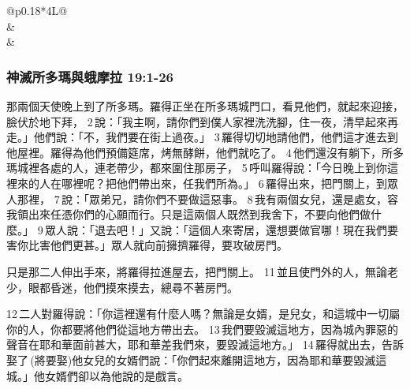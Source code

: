 \begin{table}[!hbp]
\begin{threeparttable}
\begin{tabular}{@{}p{}*{4}{L{\tabcolsep\relax}}@{}}
\\\hline
{}  
& 
\\\hline
{}  
& 
\\\hline

\end{tabular}
\caption{亞伯拉罕為羅得代求}
\label{table:YaBoLanPrayLuoDe}
\end{threeparttable}
\end{table}


\subsubsection{神滅所多瑪與蛾摩拉 19:1-26}
那兩個天使晚上到了所多瑪。羅得正坐在所多瑪城門口，看見他們，就起來迎接，臉伏於地下拜， 2 說：「我主啊，請你們到僕人家裡洗洗腳，住一夜，清早起來再走。」他們說：「不，我們要在街上過夜。」 3 羅得切切地請他們，他們這才進去到他屋裡。羅得為他們預備筵席，烤無酵餅，他們就吃了。 4 他們還沒有躺下，所多瑪城裡各處的人，連老帶少，都來圍住那房子， 5 呼叫羅得說：「今日晚上到你這裡來的人在哪裡呢？把他們帶出來，任我們所為。」 6 羅得出來，把門關上，到眾人那裡， 7 說：「眾弟兄，請你們不要做這惡事。 8 我有兩個女兒，還是處女，容我領出來任憑你們的心願而行。只是這兩個人既然到我舍下，不要向他們做什麼。」 9 眾人說：「退去吧！」又說：「這個人來寄居，還想要做官哪！現在我們要害你比害他們更甚。」眾人就向前擁擠羅得，要攻破房門。

只是那二人伸出手來，將羅得拉進屋去，把門關上。 11 並且使門外的人，無論老少，眼都昏迷，他們摸來摸去，總尋不著房門。

12 二人對羅得說：「你這裡還有什麼人嗎？無論是女婿，是兒女，和這城中一切屬你的人，你都要將他們從這地方帶出去。 13 我們要毀滅這地方，因為城內罪惡的聲音在耶和華面前甚大，耶和華差我們來，要毀滅這地方。」 14 羅得就出去，告訴娶了 (將要娶)他女兒的女婿們說：「你們起來離開這地方，因為耶和華要毀滅這城。」他女婿們卻以為他說的是戲言。

